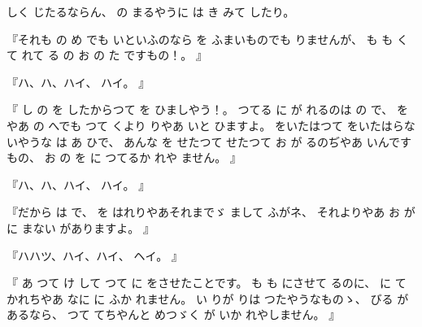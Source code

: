%
しく
じたるならん、
%
の
まるやうに
は
き
みて
したり。

%
『それも
の
め
でも
いといふのなら
を
ふまいものでも
りませんが、
%
も
も
く
て
れて
る
の
お
の
た
ですもの！。
』

%
『ハ、ハ、ハイ、
%
ハイ。
』

%
『
し
の
を
したからつて
を
ひましやう！。
%
つてる
に
が
れるのは
の
で、
%
を
やあ
の
へでも
つて
くより
りやあ
いと
ひますよ。
%
をいたはつて
をいたはらないやうな
は
あ
ひで、
%
あんな
を
せたつて
せたつて
お
が
るのぢやあ
いんですもの、
%
お
の
を
に
つてるか
れや
ません。
』

%
『ハ、ハ、ハイ、
%
ハイ。
』

%
『だから
は
で、
%
を
はれりやあそれまでゞ
まして
ふがネ、
%
それよりやあ
お
が
に
まない
がありますよ。
』

%
『ハハツ、ハイ、ハイ、
%
ヘイ。
』

%
『
あ
つて
け
して
つて
に
をさせたことです。
%
も
も
にさせて
るのに、
%
に
て
かれちやあ
なに
に
ふか
れません。
%
い
りが
りは
つたやうなものゝ、
%
びる
があるなら、
%
つて
てちやんと
めつゞく
が
いか
れやしません。
』

